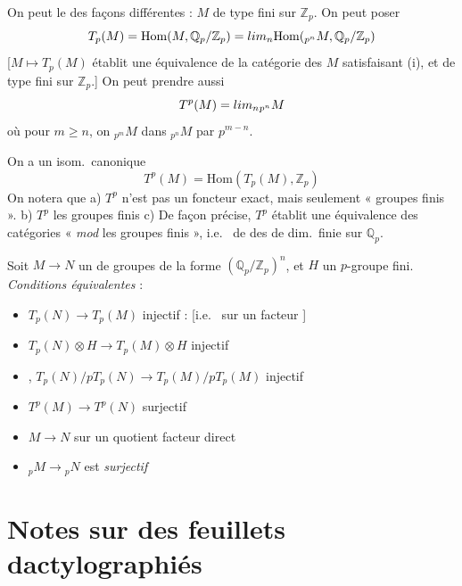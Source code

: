 \documentclass[11pt,a4paper]{article}
\begin{document}
On peut le   des façons différentes   \ill{} : $M$ \ill{} \ill{} \ill{} de type fini sur $\mathbb{Z}_p$. On peut poser
\[
T_p(M) = \mathrm{Hom}(M, \mathbb{Q}_p/\mathbb{Z}_p) = \varprojlim_n \mathrm{Hom}({}_{p^n}M, \mathbb{Q}_p/\mathbb{Z}_p)
\]
[$M \mapsto T_p(M)$ établit une équivalence de la catégorie des $M$ satisfaisant (i), et   de type fini sur $\mathbb{Z}_p$.]
On peut prendre aussi
\[
T^p(M) = \varprojlim_n {}_{p^n}M
\]
où pour $m \geq n$, on  ${}_{p^m}M$ dans ${}_{p^n}M$ par $p^{m-n}$.

On a un isom.\ canonique
\[
T^p(M) = \mathrm{Hom}(T_p(M), \mathbb{Z}_p)
\]
On notera que a) $T^p$ n'est pas un foncteur exact, mais seulement  «  groupes finis ». b) $T^p$  \ill{} les groupes finis \ill{}   \ill{}
c) De façon précise, $T^p$ établit une \struck{\ill{}} équivalence des catégories « \emph{mod} les groupes finis », i.e.\  de  des \ill{} \ill{} \ill{} \ill{} de dim.\ finie sur $\mathbb{Q}_p$.

Soit $M \to N$ un  de groupes de la forme $(\mathbb{Q}_p/\mathbb{Z}_p)^n$, et $H$ un $p$-groupe fini. \emph{Conditions équivalentes} :
\begin{itemize}
\item[(i)] $T_p(N) \to T_p(M)$ injectif :   [i.e.\  sur un facteur ]
\item[(i bis)] $T_p(N) \otimes H \to T_p(M) \otimes H$ injectif
\item[(i ter)] , $T_p(N)/pT_p(N) \to T_p(M)/pT_p(M)$ injectif
\item[(ii)] $T^p(M) \to T^p(N)$ surjectif
\item[(iii)] $M \to N$  sur un quotient facteur direct
\item[(iv)] ${}_pM \to {}_pN$ est \emph{surjectif}
\end{itemize}

\section{Notes sur des feuillets dactylographiés}
\end{document}
